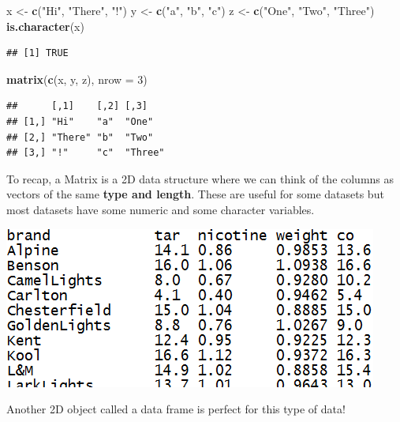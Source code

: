 \documentclass[
]{book}
\newenvironment{Shaded}{\begin{snugshade}}{\end{snugshade}}
\newcommand{\DataTypeTok}[1]{\textcolor[rgb]{0.13,0.29,0.53}{#1}}
\newcommand{\DecValTok}[1]{\textcolor[rgb]{0.00,0.00,0.81}{#1}}
\newcommand{\KeywordTok}[1]{\textcolor[rgb]{0.13,0.29,0.53}{\textbf{#1}}}
\newcommand{\NormalTok}[1]{#1}
\newcommand{\StringTok}[1]{\textcolor[rgb]{0.31,0.60,0.02}{#1}}
\theoremstyle{definition}
\theoremstyle{definition}
\theoremstyle{definition}
\theoremstyle{remark}
\begin{document}
\begin{Shaded}
\begin{Highlighting}[]
\NormalTok{x <-}\StringTok{ }\KeywordTok{c}\NormalTok{(}\StringTok{"Hi"}\NormalTok{, }\StringTok{"There"}\NormalTok{, }\StringTok{"!"}\NormalTok{)}
\NormalTok{y <-}\StringTok{ }\KeywordTok{c}\NormalTok{(}\StringTok{"a"}\NormalTok{, }\StringTok{"b"}\NormalTok{, }\StringTok{"c"}\NormalTok{)}
\NormalTok{z <-}\StringTok{ }\KeywordTok{c}\NormalTok{(}\StringTok{"One"}\NormalTok{, }\StringTok{"Two"}\NormalTok{, }\StringTok{"Three"}\NormalTok{)}
\KeywordTok{is.character}\NormalTok{(x)}
\end{Highlighting}
\end{Shaded}

\begin{verbatim}
## [1] TRUE
\end{verbatim}

\begin{Shaded}
\begin{Highlighting}[]
\KeywordTok{matrix}\NormalTok{(}\KeywordTok{c}\NormalTok{(x, y, z), }\DataTypeTok{nrow =} \DecValTok{3}\NormalTok{)}
\end{Highlighting}
\end{Shaded}

\begin{verbatim}
##      [,1]    [,2] [,3]   
## [1,] "Hi"    "a"  "One"  
## [2,] "There" "b"  "Two"  
## [3,] "!"     "c"  "Three"
\end{verbatim}

To recap, a Matrix is a 2D data structure where we can think of the columns as vectors of the same \textbf{type and length}. These are useful for some datasets but most datasets have some numeric and some character variables.

\begin{center}\includegraphics[width=0.8\linewidth]{img/dataset} \end{center}

Another 2D object called a data frame is perfect for this type of data!
\end{document}
